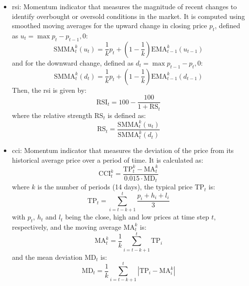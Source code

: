 \begin{itemize}
    \item \acrfull{rsi}: Momentum indicator that measures the magnitude of recent changes to identify overbought or oversold conditions in the market. It is computed using smoothed moving averages for the upward change in closing price $p_t$, defined as $u_t = \max {p_t - p_{t-1}, 0}$: 
    \begin{equation}
        \text{SMMA}_t^k (u_t) = \frac{1}{k}p_t + \left(1 - \frac{1}{k}\right)\text{EMA}_{t-1}^k (u_{t-1})
    \end{equation}
    and for the downward change, defined as $d_t = \max {p_{t-1} - p_t, 0}$:
    \begin{equation}
        \text{SMMA}_t^k (d_t) = \frac{1}{k}p_t + \left(1 - \frac{1}{k}\right)\text{EMA}_{t-1}^k (d_{t-1})
    \end{equation}
    Then, the \acrfull{rsi} is given by:
    \begin{equation}
        \text{RSI}_t = 100 - \frac{100}{1 + \text{RS}_t}
    \end{equation}
    where the relative strength $\text{RS}_t$ is defined as:
    \begin{equation}
        \text{RS}_t = \frac{\text{SMMA}_t^k (u_t)}{\text{SMMA}_t^k (d_t)}
    \end{equation}
    \item \acrfull{cci}: Momentum indicator that measures the deviation of the price from its historical average price over a period of time. It is calculated as:
    \begin{equation}
        \text{CCI}_t^k = \frac{\text{TP}_t^k - \text{MA}_t^k}{0.015 \cdot \text{MD}_t}
    \end{equation}
    where $k$ is the number of periods (14 days), the typical price $\text{TP}_t$ is:
    \begin{equation}
        \text{TP}_t = \sum_{i=t-k+1}^{t} \frac{p_{i} + h_{i} + l_{i}}{3}
    \end{equation}
    with $p_t$, $h_t$ and $l_t$ being the close, high and low prices at time step $t$, respectively, and the moving average $\text{MA}_t^k$ is:
    \begin{equation}
        \text{MA}_t^k = \frac{1}{k} \sum_{i=t-k+1}^{t} \text{TP}_i
    \end{equation}
    and the mean deviation $\text{MD}_t$ is:
    \begin{equation}
        \text{MD}_t = \frac{1}{k} \sum_{i=t-k+1}^{t} \left| \text{TP}_i - \text{MA}_i^k \right|
    \end{equation}

\end{itemize}
